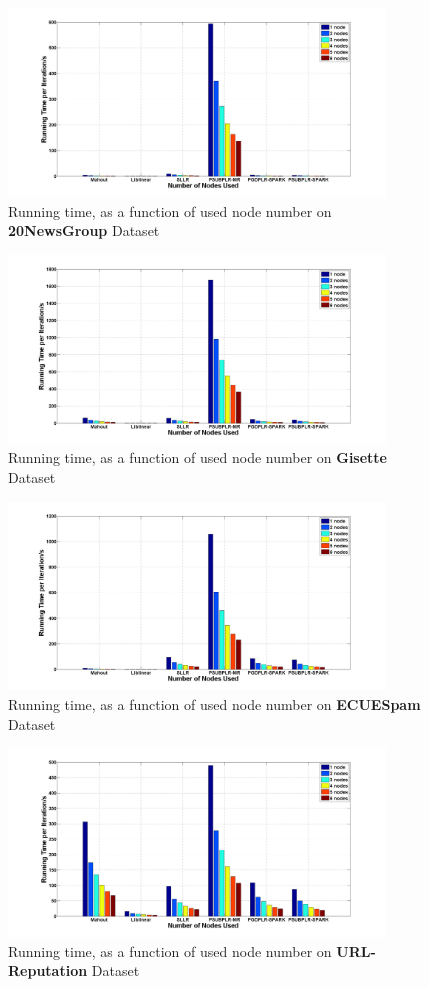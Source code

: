 \documentclass{llncs}
\begin{document}
\begin{figure}[tb] \label{fig:10}
\center \includegraphics[height=5cm,width=10cm]{img/20NewsGroup_time.png}
\caption{Running time, as a function of used node number on \textbf{20NewsGroup} Dataset}
\end{figure}

\begin{figure}[tb] \label{fig:11}
\center \includegraphics[height=5cm,width=10cm]{img/Gisette_time.png}
\caption{Running time, as a function of used node number on \textbf{Gisette} Dataset}
\end{figure}

\begin{figure}[tb] \label{fig:12}
\center \includegraphics[height=5cm,width=10cm]{img/ECUESpam_time.png}
\caption{Running time, as a function of used node number on \textbf{ECUESpam} Dataset}
\end{figure}

\begin{figure}[tb] \label{fig:13}
\center \includegraphics[height=5cm,width=10cm]{img/URL-Reputation_time.png}
\caption{Running time, as a function of used node number on \textbf{URL-Reputation} Dataset}
\end{figure}
\end{document}
